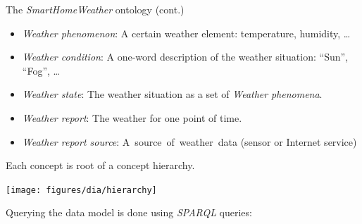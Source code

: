 \documentclass[final,hyperref={pdfpagelabels=true}]{beamer}
\begin{document}
\begin{frame}[fragile]
\begin{columns}[t]
\begin{column}{.45\textwidth}
\begin{block}{The \emph{SmartHomeWeather} ontology (cont.)}
	\begin{itemize}
  	  \item \emph{Weather phenomenon}: A certain weather
		  element: temperature, humidity, …
	  \item \emph{Weather condition}: A one-word description of the
		  weather situation: ``Sun'', ``Fog'', …
	  \item \emph{Weather state}: The weather situation as a
		  set of \emph{Weather} \emph{phenomena}.
	  \item \emph{Weather report}: The weather for one
		  point of time.
	\end{itemize}
	\hspace{-1.05cm}\begin{minipage}{\dimexpr.45\textwidth}
	  \vspace{.3em}
	  \begin{itemize}
  	    \item \emph{Weather report source}: \mbox{A source of weather data}
	  	  (sensor or Internet service)
	  \end{itemize}

	  \vspace{.5em}

	  \hfill\begin{minipage}{\dimexpr\textwidth-1.05cm}
	  Each concept is root of a concept hierarchy.
	  \end{minipage}
	\end{minipage}
	\begin{minipage}{\dimexpr.5\textwidth}
	  \centering
	  \vspace{2em}
  	  \texttt{[image: figures/dia/hierarchy]}
	\end{minipage}

	
	\vspace{1em}

	\vspace{.5em}
	Querying the data model is done using \emph{SPARQL} queries:


\end{block}
\end{column}
\end{columns}
\end{frame}
\end{document}
